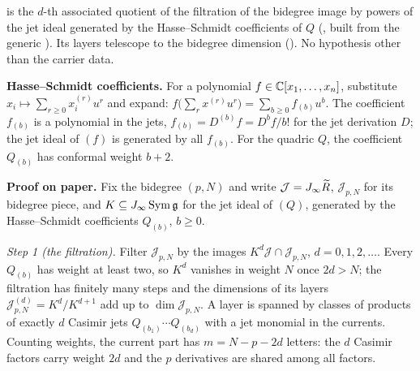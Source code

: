 \begin{dictionary}
 is the $d$-th associated quotient of the filtration of the bidegree image by powers
of the jet ideal generated by the Hasse--Schmidt coefficients of $Q$ (, built from the
generic ). Its layers telescope to the bidegree dimension
(). No hypothesis other than the carrier data.

\textbf{Hasse--Schmidt coefficients.} For a polynomial $f\in{\mathbb{C}}[x_1,\dots,x_n]$, substitute $x_i\mapsto\sum_{r\ge0}x_i^{(r)}u^r$
and expand: $f\bigl(\sum_rx^{(r)}u^r\bigr)=\sum_{b\ge0}f_{(b)}u^b$. The coefficient $f_{(b)}$ is a polynomial in the jets,
$f_{(b)}=D^{(b)}f=D^bf/b!$ for the jet derivation $D$; the jet ideal of $(f)$ is generated by all $f_{(b)}$. For the
quadric $Q$, the coefficient $Q_{(b)}$ has conformal weight $b+2$.
\end{dictionary}

\textbf{Proof on paper.} Fix the bidegree $(p,N)$ and write $\mathcal J=J_\infty\widetilde R$, $\mathcal J_{p,N}$ for
its bidegree piece, and $K\subseteq J_\infty\operatorname{Sym}\mathfrak g$ for the jet ideal of $(Q)$, generated by the
Hasse--Schmidt coefficients $Q_{(b)}$, $b\ge0$.

\emph{Step 1 (the filtration).} Filter $\mathcal J_{p,N}$ by the images $K^d\mathcal J\cap\mathcal J_{p,N}$, $d=0,1,2,\dots$.
Every $Q_{(b)}$ has weight at least two, so $K^d$ vanishes in weight $N$ once $2d>N$; the filtration has finitely many
steps and the dimensions of its layers $\mathcal J^{(d)}_{p,N}=K^d/K^{d+1}$ add up to $\dim\mathcal J_{p,N}$. A layer is
spanned by classes of products of exactly $d$ Casimir jets $Q_{(b_1)}\cdots Q_{(b_d)}$ with a jet monomial in the currents.
Counting weights, the current part has $m=N-p-2d$ letters: the $d$ Casimir factors carry weight $2d$ and the $p$
derivatives are shared among all factors.

